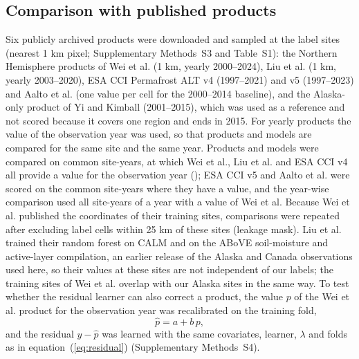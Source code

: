 \subsection{Comparison with published products}
Six publicly archived products were downloaded and sampled at the label sites (nearest 1 km pixel; Supplementary Methods~S3 and Table~S1): the Northern Hemisphere products of Wei et al.\cite{Wei2026} (1 km, yearly 2000--2024), Liu et al.\cite{Liu2024} (1 km, yearly 2003--2020), ESA CCI Permafrost ALT v4 (1997--2021) and v5 (1997--2023)\cite{Westermann2024,Westermann2025} and Aalto et al.\cite{Aalto2018} (one value per cell for the 2000--2014 baseline), and the Alaska-only product of Yi and Kimball\cite{YiKimball2019} (2001--2015), which was used as a reference and not scored because it covers one region and ends in 2015. For yearly products the value of the observation year was used, so that products and models are compared for the same site and the same year. Products and models were compared on common site-years, at which Wei et al., Liu et al. and ESA CCI v4 all provide a value for the observation year (\nyrscc); ESA CCI v5 and Aalto et al. were scored on the common site-years where they have a value, and the year-wise comparison used all site-years of a year with a value of Wei et al. Because Wei et al. published the coordinates of their training sites, comparisons were repeated after excluding label cells within 25 km of these sites (leakage mask). Liu et al. trained their random forest on CALM and on the ABoVE soil-moisture and active-layer compilation\cite{Liu2024}, an earlier release of the Alaska and Canada observations used here, so their values at these sites are not independent of our labels; the training sites of Wei et al. overlap with our Alaska sites in the same way. To test whether the residual learner can also correct a product, the value $p$ of the Wei et al. product for the observation year was recalibrated on the training fold,
\begin{equation}
\hat{p} = a + b\, p,
\label{eq:prod}
\end{equation}
and the residual $y-\hat{p}$ was learned with the same covariates, learner, $\lambda$ and folds as in equation~(\ref{eq:residual}) (Supplementary Methods~S4).

